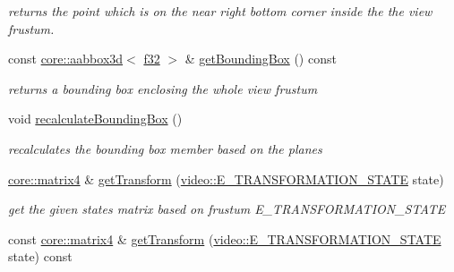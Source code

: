 \begin{DoxyCompactItemize}
\begin{DoxyCompactList}\small\item\em returns the point which is on the near right bottom corner inside the the view frustum. \end{DoxyCompactList}\item 
\mbox{\label{structirr_1_1scene_1_1SViewFrustum_a1b7fd2736250d34ff399bc17d66867c0}} 
const \hyperlink{classirr_1_1core_1_1aabbox3d}{core\+::aabbox3d}$<$ \hyperlink{namespaceirr_a0277be98d67dc26ff93b1a6a1d086b07}{f32} $>$ \& \hyperlink{structirr_1_1scene_1_1SViewFrustum_a1b7fd2736250d34ff399bc17d66867c0}{get\+Bounding\+Box} () const
\begin{DoxyCompactList}\small\item\em returns a bounding box enclosing the whole view frustum \end{DoxyCompactList}\item 
\mbox{\label{structirr_1_1scene_1_1SViewFrustum_a458eb19a23bcad50da0f9d3163e3621b}} 
void \hyperlink{structirr_1_1scene_1_1SViewFrustum_a458eb19a23bcad50da0f9d3163e3621b}{recalculate\+Bounding\+Box} ()
\begin{DoxyCompactList}\small\item\em recalculates the bounding box member based on the planes \end{DoxyCompactList}\item 
\hyperlink{namespaceirr_1_1core_a4c9d4e29899535971052810954a14431}{core\+::matrix4} \& \hyperlink{structirr_1_1scene_1_1SViewFrustum_acf8edd203e7479d2b444ed548075ffa6}{get\+Transform} (\hyperlink{namespaceirr_1_1video_a15b57657a320243be03ae6f66fcff43d}{video\+::\+E\+\_\+\+T\+R\+A\+N\+S\+F\+O\+R\+M\+A\+T\+I\+O\+N\+\_\+\+S\+T\+A\+TE} state)
\begin{DoxyCompactList}\small\item\em get the given state\textquotesingle{}s matrix based on frustum E\+\_\+\+T\+R\+A\+N\+S\+F\+O\+R\+M\+A\+T\+I\+O\+N\+\_\+\+S\+T\+A\+TE \end{DoxyCompactList}\item 
const \hyperlink{namespaceirr_1_1core_a4c9d4e29899535971052810954a14431}{core\+::matrix4} \& \hyperlink{structirr_1_1scene_1_1SViewFrustum_a9afbd4a90f330de3fde6b534da3920f8}{get\+Transform} (\hyperlink{namespaceirr_1_1video_a15b57657a320243be03ae6f66fcff43d}{video\+::\+E\+\_\+\+T\+R\+A\+N\+S\+F\+O\+R\+M\+A\+T\+I\+O\+N\+\_\+\+S\+T\+A\+TE} state) const

\end{DoxyCompactItemize}
